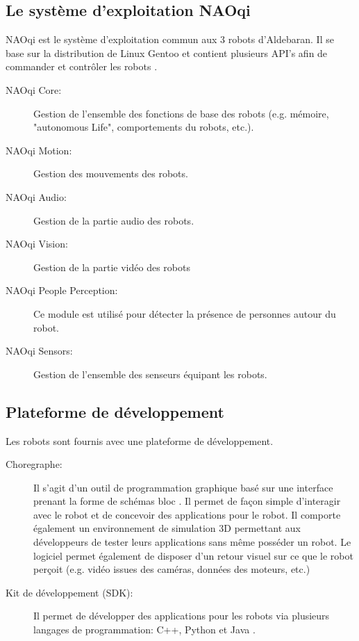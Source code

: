 \subsection{Le système d'exploitation NAOqi}
\label{Entreprise: Les produits: NAOqi}
NAOqi est le système d'exploitation commun aux 3 robots d'Aldebaran. Il se base sur la distribution de Linux Gentoo et contient plusieurs API's afin de commander et contrôler les robots \cite{NAOqiTech}.
\begin{description}
	\item [NAOqi Core:] Gestion de l'ensemble des fonctions de base des robots (e.g. mémoire, "autonomous Life", comportements du robots, etc.).
	\item [NAOqi Motion:] Gestion des mouvements des robots.
	\item [NAOqi Audio:]  Gestion de la partie audio des robots.
	\item [NAOqi Vision:] Gestion de la partie vidéo des robots
	\item [NAOqi People Perception:] Ce module est utilisé pour détecter la présence de personnes autour du robot.
	\item [NAOqi Sensors:]  Gestion de l'ensemble des senseurs équipant les robots.
\end{description} 


\subsection{Plateforme de développement}
\label{Entreprise:Les produits: Nao: Plateforme de développement}
Les robots sont fournis avec une plateforme de développement.
\begin{description}
	\item[Choregraphe:] Il s'agit d'un outil de programmation graphique basé sur une interface prenant la forme de schémas bloc \cite{ChoregrapheTech}. Il permet de façon simple d'interagir avec le robot et de concevoir des applications pour le robot. Il comporte également un environnement de simulation 3D permettant aux développeurs de tester leurs applications sans même posséder un robot. Le logiciel permet également de disposer d'un retour visuel sur ce que le robot perçoit (e.g. vidéo issues des caméras, données des moteurs, etc.) 
	
	\item[Kit de développement (SDK):] Il permet de développer des applications pour les robots via plusieurs langages de programmation:  C++, Python et Java \cite{SDKTech}.
\end{description}

